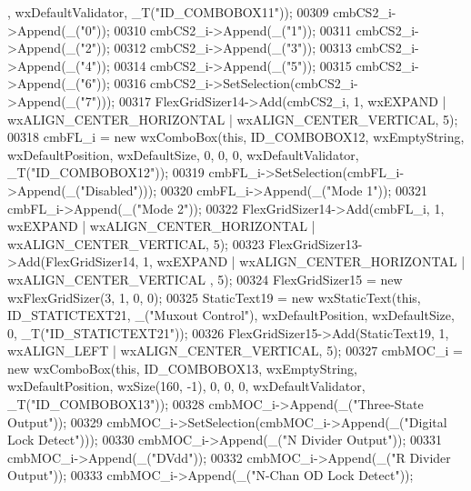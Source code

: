\begin{DoxyCode}
      , wxDefaultValidator, _T(\textcolor{stringliteral}{"ID\_COMBOBOX11"}));
00309     cmbCS2\_i->Append(\_(\textcolor{stringliteral}{"0"}));
00310     cmbCS2\_i->Append(\_(\textcolor{stringliteral}{"1"}));
00311     cmbCS2\_i->Append(\_(\textcolor{stringliteral}{"2"}));
00312     cmbCS2\_i->Append(\_(\textcolor{stringliteral}{"3"}));
00313     cmbCS2\_i->Append(\_(\textcolor{stringliteral}{"4"}));
00314     cmbCS2\_i->Append(\_(\textcolor{stringliteral}{"5"}));
00315     cmbCS2\_i->Append(\_(\textcolor{stringliteral}{"6"}));
00316     cmbCS2\_i->SetSelection(cmbCS2\_i->Append(\_(\textcolor{stringliteral}{"7"})));
00317     FlexGridSizer14->Add(cmbCS2\_i, 1, wxEXPAND | wxALIGN\_CENTER\_HORIZONTAL | wxALIGN\_CENTER\_VERTICAL, 5);
00318     cmbFL\_i = \textcolor{keyword}{new} wxComboBox(\textcolor{keyword}{this}, ID\_COMBOBOX12, wxEmptyString, wxDefaultPosition, wxDefaultSize, 0, 0, 0,
       wxDefaultValidator, _T(\textcolor{stringliteral}{"ID\_COMBOBOX12"}));
00319     cmbFL\_i->SetSelection(cmbFL\_i->Append(\_(\textcolor{stringliteral}{"Disabled"})));
00320     cmbFL\_i->Append(\_(\textcolor{stringliteral}{"Mode 1"}));
00321     cmbFL\_i->Append(\_(\textcolor{stringliteral}{"Mode 2"}));
00322     FlexGridSizer14->Add(cmbFL\_i, 1, wxEXPAND | wxALIGN\_CENTER\_HORIZONTAL | wxALIGN\_CENTER\_VERTICAL, 5);
00323     FlexGridSizer13->Add(FlexGridSizer14, 1, wxEXPAND | wxALIGN\_CENTER\_HORIZONTAL | wxALIGN\_CENTER\_VERTICAL
      , 5);
00324     FlexGridSizer15 = \textcolor{keyword}{new} wxFlexGridSizer(3, 1, 0, 0);
00325     StaticText19 = \textcolor{keyword}{new} wxStaticText(\textcolor{keyword}{this}, ID\_STATICTEXT21, \_(\textcolor{stringliteral}{"Muxout Control"}), wxDefaultPosition, 
      wxDefaultSize, 0, _T(\textcolor{stringliteral}{"ID\_STATICTEXT21"}));
00326     FlexGridSizer15->Add(StaticText19, 1, wxALIGN\_LEFT | wxALIGN\_CENTER\_VERTICAL, 5);
00327     cmbMOC\_i = \textcolor{keyword}{new} wxComboBox(\textcolor{keyword}{this}, ID\_COMBOBOX13, wxEmptyString, wxDefaultPosition, wxSize(160, -1), 0, 0,
       0, wxDefaultValidator, _T(\textcolor{stringliteral}{"ID\_COMBOBOX13"}));
00328     cmbMOC\_i->Append(\_(\textcolor{stringliteral}{"Three-State Output"}));
00329     cmbMOC\_i->SetSelection(cmbMOC\_i->Append(\_(\textcolor{stringliteral}{"Digital Lock Detect"})));
00330     cmbMOC\_i->Append(\_(\textcolor{stringliteral}{"N Divider Output"}));
00331     cmbMOC\_i->Append(\_(\textcolor{stringliteral}{"DVdd"}));
00332     cmbMOC\_i->Append(\_(\textcolor{stringliteral}{"R Divider Output"}));
00333     cmbMOC\_i->Append(\_(\textcolor{stringliteral}{"N-Chan OD Lock Detect"}));

\end{DoxyCode}
